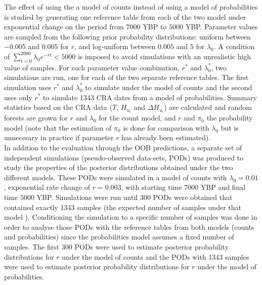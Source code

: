 \documentclass[a4paper]{article}
\begin{document}
The effect of using the a model of counts  instead of using a model of probabilities is studied by generating one reference table from each of the two model under exponential change on the period from $7000$ YBP to $5000$ YBP. Parameter values are sampled from the following prior probability distributions: uniform between $-0.005$  and $0.005$ for $r$, and log-uniform between $0.005$ and $5$ for $\lambda_0$. A condition of $\displaystyle\sum\limits_{t=0}^{2000}\lambda_0e^{-rt}<5000$ is imposed to avoid simulations with an unrealistic high value of samples. For each parameter value combination, $r^*$ and $\lambda_{0}^*$, two simulations are run, one for each of the two separate reference tables. The first simulation uses $r^*$ and $\lambda_{0}^*$ to simulate under the model of counts and the second uses only $r^*$ to simulate 1343 CRA dates from a model of probabilities. Summary statistics based on the CRA data ($T$, $H_{u_i}$ and $\Delta H_{u_i}$) are calculated and random forests are grown for $r$ and $\lambda_0$ for the count model, and $r$ and $\pi	_0$ the probability model (note that the estimation of $\pi_0$ is done for comparison with $\lambda_0$ but is unnecesary in practice if parameter $r$ has already been estimated).%
\\

In addition to the evaluation through the OOB predictions, a separate set of independent simulations (pseudo-observed data-sets, PODs) was produced to study the properties of the posterior distributions obtained under the two different models. These PODs were simulated in a model of counts with $\lambda_0=0.01$, exponential rate change of $r=0.003$, with starting time $7000$ YBP and final time $5000$ YBP. Simulations were run until 300 PODs were obtained that contained exactly 1343 samples (the expected number of samples under that model%
). Conditioning the simulation to a specific number of samples was done in order to analyse those PODs with the reference tables from both models (counts and probabilities) since the probabilities model assumes a fixed number of samples. The first 300 PODs were used to estimate posterior probability distributions for $r$ under the model of counts and the PODs with 1343 samples were used to estimate posterior probability distributions for $r$ under the model of probabilities.
\\
\end{document}
